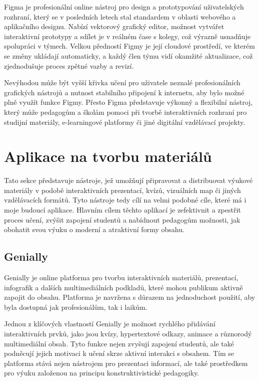 Figma je profesionální online nástroj pro design a prototypování uživatelských rozhraní, který se v posledních letech stal standardem v oblasti webového a aplikačního designu. 
Nabízí vektorový grafický editor, možnost vytvářet interaktivní prototypy a sdílet je v reálném čase s kolegy, což výrazně usnadňuje spolupráci v týmech. 
Velkou předností Figmy je její cloudové prostředí, ve kterém se změny ukládají automaticky, a každý člen týmu vidí okamžité aktualizace, což zjednodušuje proces zpětné vazby a revizí. 

Nevýhodou může být vyšší křivka učení pro uživatele neznalé profesionálních grafických nástrojů a nutnost stabilního připojení k internetu, aby bylo možné plně využít funkce Figmy. 
Přesto Figma představuje výkonný a flexibilní nástroj, který může pedagogům a školám pomoci při tvorbě interaktivních rozhraní pro studijní materiály, e-learningové platformy či jiné digitální vzdělávací projekty.

\section{Aplikace na tvorbu materiálů}

Tato sekce představuje nástroje, jež umožňují připravovat a distribuovat výukové materiály v podobě interaktivních prezentací, kvízů, vizuálních map či jiných vzdělávacích formátů.
Tyto nástroje tedy cílí na velmi podobné cíle, které má i moje budoucí aplikace.
Hlavním cílem těchto aplikací je zefektivnit a zpestřit proces učení, zvýšit zapojení studentů a nabídnout pedagogům možnosti, jak obohatit svou výuku o moderní a atraktivní formy obsahu.

\subsection{Genially}

Genially je online platforma pro tvorbu interaktivních materiálů, prezentací, infografik a dalších multimediálních podkladů, které mohou publikum aktivně zapojit do obsahu.
Platforma je navržena s důrazem na jednoduchost použití, aby byla dostupná jak profesionálům, tak i laikům.

Jednou z klíčových vlastností Genially je možnost rychlého přidávání interaktivních prvků, jako jsou kvízy, hypertextové odkazy, animace a různorodý multimediální obsah. 
Tyto funkce nejen zvyšují zapojení studentů, ale také podněcují jejich motivaci k učení skrze aktivní interakci s obsahem. 
Tím se platforma stává nejen nástrojem pro prezentaci informací, ale také prostředkem pro výuku založenou na principu konstruktivistické pedagogiky. 

